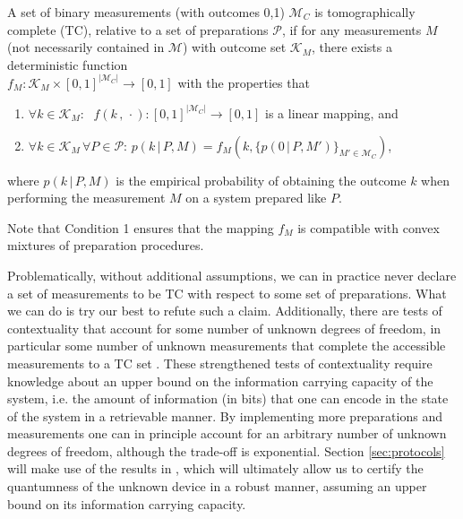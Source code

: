 \begin{definition}
\label{def:tc}
A set of binary measurements (with outcomes 0,1) $\mathcal{M}_C$ is tomographically complete (TC), relative to a set of preparations $\mathcal{P}$, if for any measurements $M$ (not necessarily contained in $\mathcal{M}$) with outcome set $\mathcal{K}_{M}$, there exists a deterministic function \\${f_M:\mathcal{K}_{M}\times[0,1]^{\vert\mathcal{M}_C \vert}\rightarrow [0,1]}$ with the properties that
\begin{enumerate}
\item $\forall k\in\mathcal{K}_{M}:\;$ $f(k\,,\,\cdot):[0,1]^{\vert\mathcal{M}_C\vert}\rightarrow [0,1]$ is a linear mapping, and
\item $\forall k\in\mathcal{K}_{M}\,\forall P\in\mathcal{P}$: $p(k\,\vert\, P,M)=f_M(k,\{p(0\,\vert\,P,M')\}_{M'\in\mathcal{M}_C})$,
\end{enumerate}
where $p(k\,\vert\, P,M)$ is the empirical probability of obtaining the outcome $k$ when performing the measurement $M$ on a system prepared like $P$.
\end{definition}
Note that Condition 1 ensures that the mapping $f_M$ is compatible with convex mixtures of preparation procedures.

Problematically, without additional assumptions, we can in practice never declare a set of measurements to be TC with respect to some set of preparations. What we can do is try our best to refute such a claim. Additionally, there are tests of contextuality that account for some number of unknown degrees of freedom, in particular some number of unknown measurements that complete the accessible measurements to a TC set \cite{Pusey2019a}. These strengthened tests of contextuality require knowledge about an upper bound on the information carrying capacity of the system, i.e. the amount of information (in bits) that one can encode in the state of the system in a retrievable manner. By implementing more preparations and measurements one can in principle account for an arbitrary number of unknown degrees of freedom, although the trade-off is exponential. Section \ref{sec:protocols} will make use of the results in \cite{Pusey2019a}, which will ultimately allow us to certify the quantumness of the unknown device in a robust manner, assuming an upper bound on its information carrying capacity.

